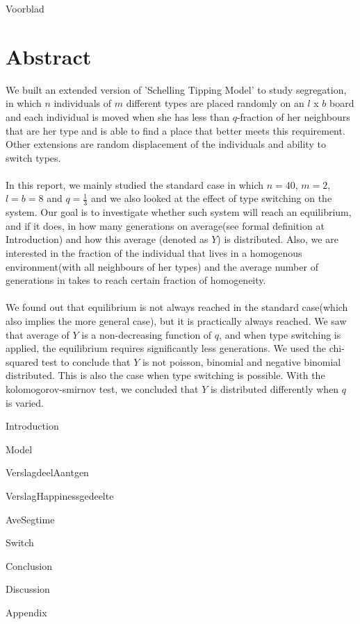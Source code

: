\documentclass{article}
\begin{document}
{Voorblad}
\newpage


\section*{Abstract}
We built an extended version of 'Schelling Tipping Model' to study segregation, in which $n$ individuals of $m$ different types are placed randomly on an $l$ x $b$ board and each individual is moved when she has less than $q$-fraction of her neighbours that are her type and is able to find a place that better meets this requirement. Other extensions are random displacement of the individuals and ability to switch types.\\
\\
In this report, we mainly studied the standard case in which $n=40$, $m=2$, $l=b=8$ and $q=\frac{1}{3}$ and we also looked at the effect of type switching on the system. Our goal is to investigate whether such system will reach an equilibrium, and if it does, in how many generations on average(see formal definition at Introduction) and how this average (denoted as $Y$) is distributed. Also, we are interested in the fraction of the individual that lives in a homogenous environment(with all neighbours of her types) and the average number of generations in takes to reach certain fraction of homogeneity.\\
\\
We found out that equilibrium is not always reached in the standard case(which also implies the more general case), but it is practically always reached. We saw that average of $Y$ is a non-decreasing function of $q$, and when type switching is applied, the equilibrium requires significantly less generations. We used the chi-squared test to conclude that $Y$ is not poisson, binomial and negative binomial distributed. This is also the case when type switching is possible. With the kolomogorov-smirnov test, we concluded that $Y$ is distributed differently when $q$ is varied.



\newpage

\tableofcontents
\newpage

{Introduction}
\newpage

{Model}
\newpage


\newpage

{VerslagdeelAantgen}
\newpage

{VerslagHappinessgedeelte}
\newpage

{AveSegtime}
\newpage

{Switch}
\newpage

{Conclusion}
\newpage

{Discussion}
\newpage

{Appendix}
\end{document}
